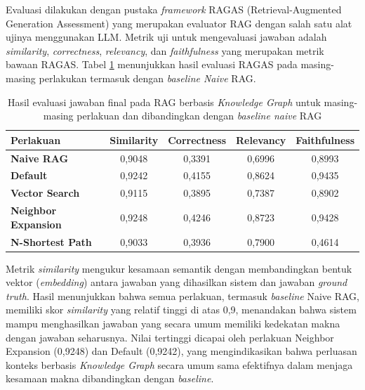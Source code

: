 Evaluasi dilakukan dengan pustaka \textit{framework} RAGAS (Retrieval-Augmented Generation Assessment) yang merupakan evaluator RAG dengan salah satu alat ujinya menggunakan LLM.
Metrik uji untuk mengevaluasi jawaban adalah \textit{similarity}, \textit{correctness}, \textit{relevancy}, dan \textit{faithfulness} yang merupakan metrik bawaan RAGAS.
Tabel \ref{tab:final-answer-evaluation-result} menunjukkan hasil evaluasi RAGAS pada masing-masing perlakukan termasuk dengan \textit{baseline Naive} RAG.

\begin{table}[H]
	\centering
	\caption{Hasil evaluasi jawaban final pada RAG berbasis \textit{Knowledge Graph} untuk masing-masing perlakuan dan dibandingkan dengan \textit{baseline naive} RAG}
	\label{tab:final-answer-evaluation-result}
	\begin{tabular}{|l|c|c|c|c|}
		\hline
		\textbf{Perlakuan}          & \textbf{Similarity} & \textbf{Correctness} & \textbf{Relevancy} & \textbf{Faithfulness} \\
		\hline \hline
		\textbf{Naive RAG}          & 0,9048              & 0,3391               & 0,6996             & 0,8993                \\
		\hline
		\textbf{Default}            & 0,9242              & 0,4155               & 0,8624             & 0,9435                \\
		\hline
		\textbf{Vector Search}      & 0,9115              & 0,3895               & 0,7387             & 0,8902                \\
		\hline
		\textbf{Neighbor Expansion} & 0,9248              & 0,4246               & 0,8723             & 0,9428                \\
		\hline
		\textbf{N-Shortest Path}    & 0,9033              & 0,3936               & 0,7900             & 0,4614                \\
		\hline
	\end{tabular}
\end{table}

Metrik \textit{similarity} mengukur kesamaan semantik dengan membandingkan bentuk vektor (\textit{embedding}) antara jawaban yang dihasilkan sistem dan jawaban \textit{ground truth}.
Hasil menunjukkan bahwa semua perlakuan, termasuk \textit{baseline} Naive RAG, memiliki skor \textit{similarity} yang relatif tinggi di atas 0,9, menandakan bahwa sistem mampu menghasilkan jawaban yang secara umum memiliki kedekatan makna dengan jawaban seharusnya.
Nilai tertinggi dicapai oleh perlakuan Neighbor Expansion (0,9248) dan Default (0,9242), yang mengindikasikan bahwa perluasan konteks berbasis \textit{Knowledge Graph} secara umum sama efektifnya dalam menjaga kesamaan makna dibandingkan dengan \textit{baseline}.

